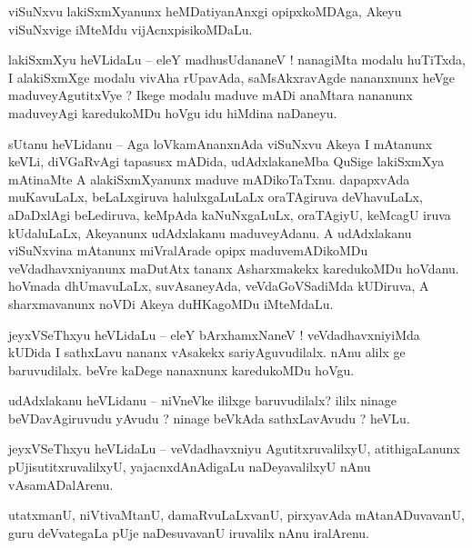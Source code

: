 \documentclass{article}
\begin{document}
\begin{mn}%
viSuNxvu lakiSxmXyanunx heMDatiyanAnxgi opipxkoMDAga, Akeyu viSuNxvige iMteMdu vijAcnxpisikoMDaLu.
\end{mn}

\begin{mn}%
lakiSxmXyu heVLidaLu -- eleY madhusUdananeV ! nanagiMta modalu huTiTxda, I alakiSxmXge modalu 
vivAha rUpavAda, saMsAkxravAgde nananxnunx heVge maduveyAgutitxVye ? Ikege modalu maduve  mADi 
anaMtara nananunx maduveyAgi karedukoMDu hoVgu idu hiMdina naDaneyu.
\end{mn}

\begin{mn}%
sUtanu heVLidanu -- Aga loVkamAnanxnAda viSuNxvu Akeya I mAtanunx keVLi, diVGaRvAgi tapasusx 
mADida, udAdxlakaneMba QuSige lakiSxmXya mAtinaMte A alakiSxmXyanunx maduve mADikoTaTxnu. 
dapapxvAda muKavuLaLx, beLaLxgiruva halulxgaLuLaLx oraTAgiruva deVhavuLaLx, aDaDxlAgi beLediruva, 
keMpAda kaNuNxgaLuLx, oraTAgiyU, keMcagU iruva kUdaluLaLx, Akeyanunx udAdxlakanu maduveyAdanu. A 
udAdxlakanu viSuNxvina mAtanunx miVralArade opipx maduvemADikoMDu veVdadhavxniyanunx maDutAtx 
tananx Asharxmakekx karedukoMDu hoVdanu. hoVmada dhUmavuLaLx, suvAsaneyAda, veVdaGoVSadiMda 
kUDiruva, A sharxmavanunx noVDi Akeya duHKagoMDu iMteMdaLu.
\end{mn}

\begin{mn}%
jeyxVSeThxyu heVLidaLu -- eleY bArxhamxNaneV ! veVdadhavxniyiMda kUDida I sathxLavu nananx 
vAsakekx sariyAguvudilalx. nAnu alilx ge baruvudilalx. beVre kaDege nanaxnunx karedukoMDu hoVgu.
\end{mn}

\begin{mn}%
udAdxlakanu heVLidanu -- niVneVke ililxge baruvudilalx? ililx ninage beVDavAgiruvudu yAvudu ? 
ninage beVkAda sathxLavAvudu ? heVLu.
\end{mn}

\begin{mn}%
jeyxVSeThxyu heVLidaLu -- veVdadhavxniyu AgutitxruvalilxyU, atithigaLanunx pUjisutitxruvalilxyU, 
yajacnxdAnAdigaLu naDeyavalilxyU nAnu vAsamADalArenu.
\end{mn}

\begin{mn}%
utatxmanU, niVtivaMtanU, damaRvuLaLxvanU, pirxyavAda mAtanADuvavanU, guru deVvategaLa pUje 
naDesuvavanU iruvalilx nAnu iralArenu.
\end{mn}
\end{document}
